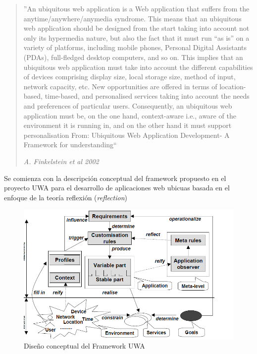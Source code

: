 \begin{quote}
''An ubiquitous web application is a Web application that suffers from the anytime/anywhere/anymedia syndrome. This means that an ubiquitous web application should be designed from the start taking into account
not only its hypermedia nature, but also the fact that it must run “as is” on a variety of platforms, including mobile phones, Personal Digital Assistants (PDAs), full-fledged desktop computers, and so on. This
implies that an ubiquitous web application must take into account the different capabilities of devices comprising display size, local storage size, method of input, network capacity, etc. New opportunities are
offered in terms of location-based, time-based, and personalised services taking into account the needs and preferences of particular users. Consequently, an ubiquitous web application must be, on the one
hand, context-aware i.e., aware of the environment it is running in, and on the other hand it must support personalisation From: Ubiquitous Web Application Development- A Framework for understanding``

\begin{flushright}
\textit{A. Finkelstein et al 2002}
\end{flushright}
\end{quote} 


Se comienza con la descripción conceptual del framework propuesto en el proyecto UWA para el desarrollo de aplicaciones web ubicuas basada en el enfoque de la teoría reflexión (\textit{reflection})



\begin{figure}[t]
\begin{center}
 \includegraphics[width=5 in,totalheight=4 in] {Ch1/Figuras/UWAFramework2.png}
\caption{Diseño conceptual del Framework UWA}\label{fig:uwaFramework}
\end{center}
\end{figure}



